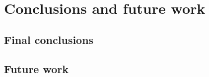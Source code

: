 \renewcommand{\documentname}{Conclusions and future work}

\chapter{Conclusions and future work}

\section{Final conclusions}
\section{Future work}

